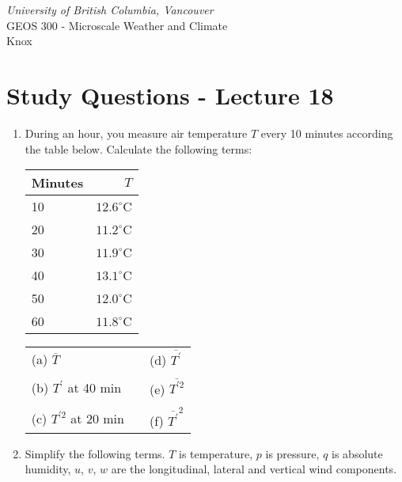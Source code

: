 \documentclass[11pt]{article}
\author{Andy Black and Andreas Christen}
\begin{document}
\begin{center}
\emph{University of British Columbia, Vancouver}\\
GEOS 300 - Microscale Weather and Climate\\
Knox
\section*{Study Questions - Lecture 18}
\end{center}

\begin{enumerate}

\item During an hour, you measure air temperature $T$ every 10 minutes according the table below. Calculate the following terms:

\begin{center}
\begin{tabular}{|l|r|}
\hline
Minutes & $T$ \\
\hline
10 & $12.6^{\circ}\textrm{C}$ \\
\hline
20 & $11.2^{\circ}\textrm{C}$ \\
\hline
30 & $11.9^{\circ}\textrm{C}$ \\
\hline
40 & $13.1^{\circ}\textrm{C}$ \\
\hline
50 & $12.0^{\circ}\textrm{C}$ \\
\hline
60 & $11.8^{\circ}\textrm{C}$ \\
\hline
\end{tabular}
\end{center}

\vspace{0.2cm}
\begin{tabular}{lll}
(a) $\overline{T}$ & \hspace{1cm} & (d) $\overline{T^{\prime}}$  \\
\vspace{0.1cm}\\
(b) $T^{\prime}$ at 40 min & \hspace{1cm} &  (e) $\overline{T^{\prime 2}}$  \\
\vspace{0.1cm}\\
(c)  $T^{\prime 2}$ at 20 min  & \hspace{1.94cm} &  (f) $\overline{T^{\prime}}^2$ \\
\end{tabular}
\vspace{0.2cm}

\item Simplify the following terms. $T$ is temperature, $p$ is pressure, $q$ is absolute humidity, $u$, $v$, $w$ are the longitudinal, lateral and vertical wind components.


\end{enumerate}
\end{document}
